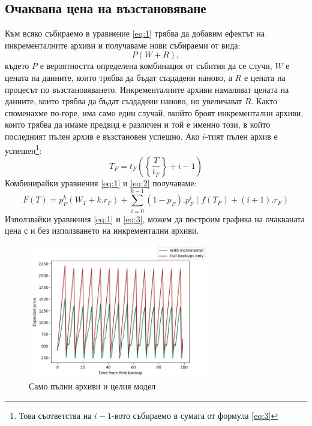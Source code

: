 \documentclass[11pt, a4paper]{article}
\theoremstyle{definition}
\begin{document}
			\subsection{Очаквана цена на възстановяване}
				Към всяко събираемо в уравнение \ref{eq:1} трябва да добавим ефектът на инкременталните архиви и получаваме нови събираеми от вида:
				$$
				P(W + R),
				$$
				където $P$ е вероятността определена комбинация от събития да се случи, $W$ е цената на данните, които трябва да бъдат създадени наново, а $R$ е цената на процесът по възстановяването. Инкременталните архиви намаляват цената на данните, които трябва да бъдат създадени наново, но увеличават $R$. Както споменахме по-горе, има само един случай, вкойто броят инкрементални архиви, които трябва да имаме предвид е различен и той е именно този, в който последният пълен архив е възстановен успешно. Ако $i$-тият пълен архив е успешен\footnote{Това съответства на $i-1$-вото събираемо в сумата от формула \ref{eq:3}}:
				$$
				T_F=t_F\left(\left\{ \frac{T}{t_F} \right\} + i - 1\right)
				$$
				Комбинирайки уравнения \ref{eq:1} и \ref{eq:2} получаваме:
				\begin{equation}\label{eq:3}
				F(T) = p_F^{k}(W_T+k.r_F) + \displaystyle\sum_{i=0}^{k-1}(1-p_F).p_F^{i}\left(f(T_F) + (i+1).r_F\right)
				\end{equation}
				Използвайки уравнения \ref{eq:1} и \ref{eq:3}, можем да построим графика на очакваната цена с и без използването на инкрементални архиви.
				\begin{figure}[H]
					\begin{minipage}{1.0\textwidth}
						\centering
						\includegraphics[width=0.7\textwidth]{Weekly_full.png}
						\caption{Само пълни архиви и целия модел}\label{Fig:FullWeekly}
					\end{minipage}
				\end{figure}
\newpage
\end{document}
